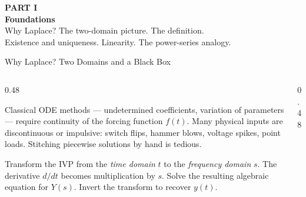 \documentclass[aspectratio=169,11pt]{beamer}
\begin{document}
{
\begin{frame}[plain]
\vspace{2cm}
{\color{accentorange}\Huge\textbf{PART I}}\\[0.4cm]
{\color{white}\Huge\textbf{Foundations}}\\[0.8cm]
{\color{white!85}\large Why Laplace? The two-domain picture. The definition.\\
Existence and uniqueness. Linearity. The power-series analogy.}
\end{frame}
}

\begin{frame}{Why Laplace? Two Domains and a Black Box}
\footnotesize
\begin{columns}[T]
\begin{column}{0.48\textwidth}
\begin{topicsbox}
Classical ODE methods --- undetermined coefficients, variation of parameters --- require continuity of the forcing function $f(t)$. Many physical inputs are discontinuous or impulsive: switch flips, hammer blows, voltage spikes, point loads. Stitching piecewise solutions by hand is tedious.
\end{topicsbox}
\vspace{0.5mm}
\begin{methodbox}
Transform the IVP from the \emph{time domain} $t$ to the \emph{frequency domain} $s$. The derivative $d/dt$ becomes multiplication by $s$. Solve the resulting algebraic equation for $Y(s)$. Invert the transform to recover $y(t)$.
\end{methodbox}
\end{column}
\begin{column}{0.48\textwidth}
\centering
{}
\end{column}
\end{columns}
\end{frame}
\end{document}

